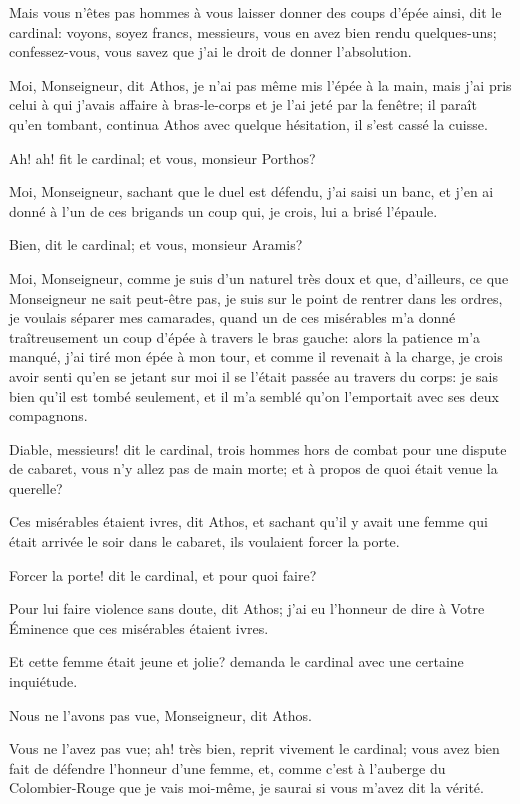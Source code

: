 \speak  Mais vous n'êtes pas hommes à vous laisser donner des coups d'épée ainsi, dit le cardinal: voyons, soyez francs, messieurs, vous en avez bien rendu quelques-uns; confessez-vous, vous savez que j'ai le droit de donner l'absolution. 

\speak  Moi, Monseigneur, dit Athos, je n'ai pas même mis l'épée à la main, mais j'ai pris celui à qui j'avais affaire à bras-le-corps et je l'ai jeté par la fenêtre; il paraît qu'en tombant, continua Athos avec quelque hésitation, il s'est cassé la cuisse. 

\speak  Ah! ah! fit le cardinal; et vous, monsieur Porthos? 

\speak  Moi, Monseigneur, sachant que le duel est défendu, j'ai saisi un banc, et j'en ai donné à l'un de ces brigands un coup qui, je crois, lui a brisé l'épaule. 

\speak  Bien, dit le cardinal; et vous, monsieur Aramis? 

\speak  Moi, Monseigneur, comme je suis d'un naturel très doux et que, d'ailleurs, ce que Monseigneur ne sait peut-être pas, je suis sur le point de rentrer dans les ordres, je voulais séparer mes camarades, quand un de ces misérables m'a donné traîtreusement un coup d'épée à travers le bras gauche: alors la patience m'a manqué, j'ai tiré mon épée à mon tour, et comme il revenait à la charge, je crois avoir senti qu'en se jetant sur moi il se l'était passée au travers du corps: je sais bien qu'il est tombé seulement, et il m'a semblé qu'on l'emportait avec ses deux compagnons. 

\speak  Diable, messieurs! dit le cardinal, trois hommes hors de combat pour une dispute de cabaret, vous n'y allez pas de main morte; et à propos de quoi était venue la querelle? 

\speak  Ces misérables étaient ivres, dit Athos, et sachant qu'il y avait une femme qui était arrivée le soir dans le cabaret, ils voulaient forcer la porte. 

\speak  Forcer la porte! dit le cardinal, et pour quoi faire? 

\speak  Pour lui faire violence sans doute, dit Athos; j'ai eu l'honneur de dire à Votre Éminence que ces misérables étaient ivres. 

\speak  Et cette femme était jeune et jolie? demanda le cardinal avec une certaine inquiétude. 

\speak  Nous ne l'avons pas vue, Monseigneur, dit Athos. 

\speak  Vous ne l'avez pas vue; ah! très bien, reprit vivement le cardinal; vous avez bien fait de défendre l'honneur d'une femme, et, comme c'est à l'auberge du Colombier-Rouge que je vais moi-même, je saurai si vous m'avez dit la vérité. 

